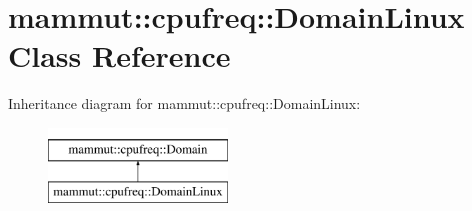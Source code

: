 \hypertarget{classmammut_1_1cpufreq_1_1DomainLinux}{\section{mammut\-:\-:cpufreq\-:\-:Domain\-Linux Class Reference}
\label{classmammut_1_1cpufreq_1_1DomainLinux}
}
Inheritance diagram for mammut\-:\-:cpufreq\-:\-:Domain\-Linux\-:\begin{figure}[H]
\begin{center}
\leavevmode
\includegraphics[height=2.000000cm]{classmammut_1_1cpufreq_1_1DomainLinux}
\end{center}
\end{figure}
